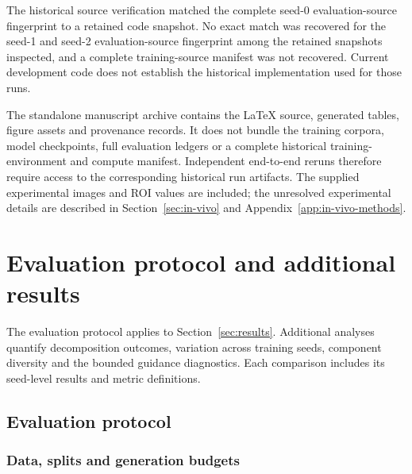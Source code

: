 \documentclass{article}
\theoremstyle{definition}
\begin{document}
The historical source verification matched the complete seed-0 evaluation-source fingerprint to
a retained code snapshot. No exact match was recovered for the seed-1 and seed-2 evaluation-source
fingerprint among the retained snapshots inspected, and a complete training-source manifest was
not recovered. Current development code does not establish the historical
implementation used for those runs.

The standalone manuscript archive contains the LaTeX source, generated tables, figure assets and
provenance records. It does not bundle the training corpora, model checkpoints, full evaluation
ledgers or a complete historical training-environment and compute manifest. Independent end-to-end
reruns therefore require access to the corresponding historical run artifacts. The supplied
experimental images and ROI values are included; the unresolved experimental details are described
in Section~\ref{sec:in-vivo} and Appendix~\ref{app:in-vivo-methods}.

\clearpage

\section{Evaluation protocol and additional results}
\label{app:results}

The evaluation protocol applies to Section~\ref{sec:results}. Additional analyses quantify
decomposition outcomes, variation across training seeds, component diversity and the bounded guidance
diagnostics. Each comparison includes its seed-level results and metric definitions.

\FloatBarrier
\subsection{Evaluation protocol}
\label{app:evaluation-protocol}

\subsubsection{Data, splits and generation budgets}
\end{document}
